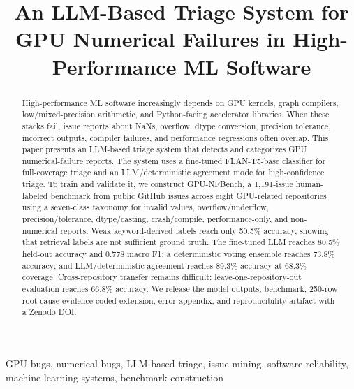 \documentclass[conference]{IEEEtran}
\newcommand{\bench}{GPU-NFBench}
\begin{document}
\title{An LLM-Based Triage System for GPU Numerical Failures in High-Performance ML Software}

\author{
}

\maketitle

\begin{abstract}
High-performance ML software increasingly depends on GPU kernels, graph
compilers, low/mixed-precision arithmetic, and Python-facing accelerator
libraries. When these stacks fail, issue reports about NaNs, overflow, dtype
conversion, precision tolerance, incorrect outputs, compiler failures, and
performance regressions often overlap. This paper presents an LLM-based triage
system that detects and categorizes GPU numerical-failure reports. The system
uses a fine-tuned FLAN-T5-base classifier for full-coverage triage and an
LLM/deterministic agreement mode for high-confidence triage. To train and
validate it, we construct \bench{}, a 1,191-issue human-labeled benchmark from
public GitHub issues across eight GPU-related repositories using a seven-class
taxonomy for invalid values, overflow/underflow, precision/tolerance,
dtype/casting, crash/compile, performance-only, and non-numerical reports.
Weak keyword-derived labels reach only 50.5\% accuracy, showing that retrieval
labels are not sufficient ground truth. The fine-tuned LLM reaches 80.5\%
held-out accuracy and 0.778 macro F1; a deterministic voting ensemble reaches
73.8\% accuracy; and LLM/deterministic agreement reaches 89.3\% accuracy at
68.3\% coverage. Cross-repository transfer remains difficult:
leave-one-repository-out evaluation reaches 66.8\% accuracy. We release the
model outputs, benchmark, 250-row root-cause evidence-coded extension, error
appendix, and reproducibility artifact with a Zenodo DOI.
\end{abstract}

\begin{IEEEkeywords}
GPU bugs, numerical bugs, LLM-based triage, issue mining, software reliability,
machine learning systems, benchmark construction
\end{IEEEkeywords}
\end{document}
